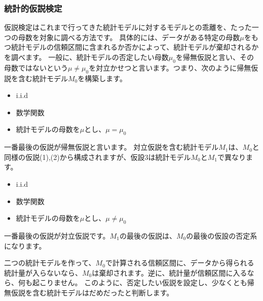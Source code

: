 \documentclass[a4paper,11pt,dvipdfmx]{jsarticle}
\begin{document}
\subsubsection{統計的仮説検定}
仮説検定はこれまで行ってきた統計モデルに対するモデルとの乖離を、たった一つの母数を対象に調べる方法です。
具体的には、データがある特定の母数$\mu$をもつ統計モデルの信頼区間に含まれるか否かによって、統計モデルが棄却されるかを調べます。
一般に、統計モデルの否定したい母数$\mu_0$を帰無仮説と言い、その母数ではないという$\mu\neq\mu_0$を対立かせつと言います。つまり、次のように帰無仮説を含む統計モデル$M_0$を構築します。
\begin{itemize}
    \item i.i.d
    \item 数学関数
    \item 統計モデルの母数を$\mu$とし、$\mu=\mu_0$
\end{itemize}
一番最後の仮説が帰無仮説と言います。
対立仮説を含む統計モデル$M_1$は、$M_0$と同様の仮説(1),(2)から構成されますが、仮設3は統計モデル$M_0$と$M_1$で異なります。
\begin{itemize}
    \item i.i.d
    \item 数学関数
    \item 統計モデルの母数を$\mu$とし、$\mu\neq\mu_0$
\end{itemize}
一番最後の仮説が対立仮説です。$M_1$の最後の仮説は、$M_0$の最後の仮設の否定系になります。

二つの統計モデルを作って、$M_0$で計算される信頼区間に、データから得られる統計量が入らないなら、$M_0$は棄却されます。逆に、統計量が信頼区間に入るなら、何も起こりません。
このように、否定したい仮説を設定し、少なくとも帰無仮説を含む統計モデルはだめだったと判断します。
\end{document}
